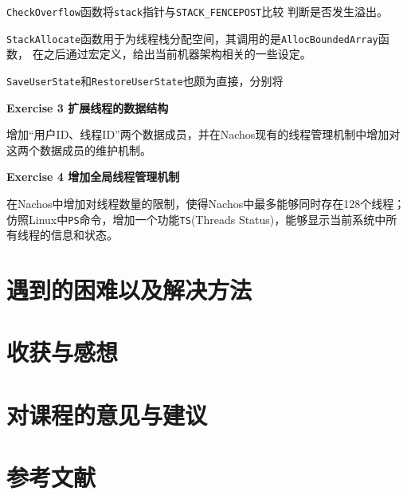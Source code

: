 \texttt{CheckOverflow}函数将\texttt{stack}指针与\texttt{STACK\_FENCEPOST}比较
判断是否发生溢出。

\texttt{StackAllocate}函数用于为线程栈分配空间，其调用的是\texttt{AllocBoundedArray}函数，
在之后通过宏定义，给出当前机器架构相关的一些设定。

\texttt{SaveUserState}和\texttt{RestoreUserState}也颇为直接，分别将

\textbf{Exercise 3  扩展线程的数据结构}

增加“用户ID、线程ID”两个数据成员，并在Nachos现有的线程管理机制中增加对这两个数据成员的维护机制。

\textbf{Exercise 4  增加全局线程管理机制}

在Nachos中增加对线程数量的限制，使得Nachos中最多能够同时存在128个线程；
仿照Linux中\texttt{PS}命令，增加一个功能\texttt{TS}(Threads Status)，能够显示当前系统中所有线程的信息和状态。

\section{遇到的困难以及解决方法}

\section{收获与感想}

\section{对课程的意见与建议}

\section{参考文献}